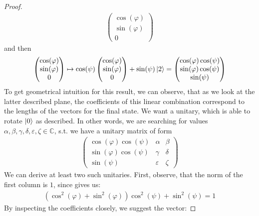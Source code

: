 \begin{proof}
\begin{align}
\begin{pmatrix}
            \cos(\varphi)\\
            \sin(\varphi)\\
            0
        \end{pmatrix}
    \end{align}
    and then
    \begin{align}
        \begin{pmatrix}
            \cos(\varphi)\\
            \sin(\varphi)\\
            0
        \end{pmatrix} \mapsto \cos(\psi) \begin{pmatrix}
            \cos(\varphi)\\
            \sin(\varphi)\\
            0
        \end{pmatrix} + \sin(\psi) \ket{2} = \begin{pmatrix}
            \cos(\varphi)\cos(\psi)\\
            \sin(\varphi)\cos(\psi)\\
            \sin(\psi)
        \end{pmatrix}
    \end{align}
    To get geometrical intuition for this result, we can observe, that as we look at the latter described plane, the coefficients of this linear combination correspond to the lengths of the vectors for the final state. We want a unitary, which is able to rotate \(\ket{0}\) as described. In other words, we are searching for values \(\alpha, \beta, \gamma, \delta, \varepsilon, \zeta \in \mathbb{C}\), s.t. we have a unitary matrix of form
    \begin{align}
        \begin{pmatrix}
            \cos(\varphi)\cos(\psi) & \alpha      & \beta \\
            \sin(\varphi)\cos(\psi) & \gamma      & \delta \\
            \sin(\psi)              & \varepsilon & \zeta
        \end{pmatrix}
    \end{align}
    We can derive at least two such unitaries. First, observe, that the norm of the first column is \(1\), since  gives us:
    \begin{align}
        (\cos^2(\varphi)+\sin^2(\varphi))\cos^2(\psi)+\sin^2(\psi) = 1
    \end{align}
    By inspecting the coefficients closely, we suggest the vector:

\end{proof}
